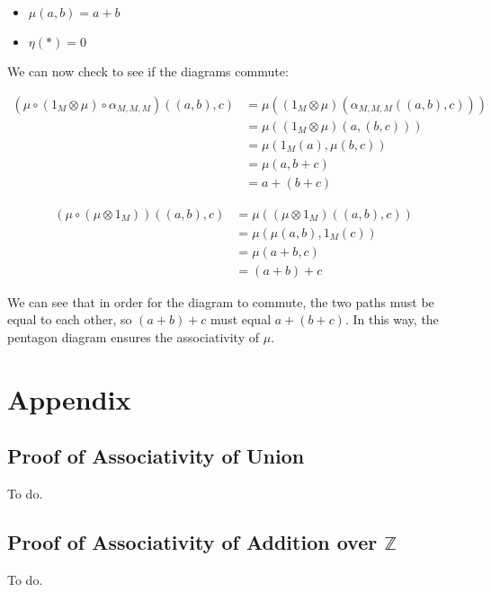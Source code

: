 \documentclass{article}
\begin{document}
\begin{itemize}
  \item $\mu(a, b) = a + b$
  \item $\eta(*) = 0$
\end{itemize}

We can now check to see if the diagrams commute:

\begin{equation*}
  \begin{split}
    (\mu \circ (1_M \otimes \mu) \circ \alpha_{M, M, M})((a, b), c)
      & = \mu((1_M \otimes \mu)(\alpha_{M, M, M}((a, b), c))) \\
      & = \mu((1_M \otimes \mu)(a, (b, c))) \\
      & = \mu(1_M(a), \mu(b, c)) \\
      & = \mu(a, b + c) \\
      & = a + (b + c)
  \end{split}
\end{equation*}

\begin{equation*}
  \begin{split}
    (\mu \circ (\mu \otimes 1_M))((a, b), c)
      & = \mu((\mu \otimes 1_M)((a, b), c)) \\
      & = \mu(\mu(a, b), 1_M(c)) \\
      & = \mu(a + b, c) \\
      & = (a + b) + c
  \end{split}
\end{equation*}

We can see that in order for the diagram to commute, the two paths must be
equal to each other, so $(a + b) + c$ must equal $a + (b + c)$. In this way,
the pentagon diagram ensures the associativity of $\mu$.

\section{Appendix}

\subsection{Proof of Associativity of Union}

To do.

\subsection{Proof of Associativity of Addition over $\mathbb{Z}$}

To do.
\end{document}
